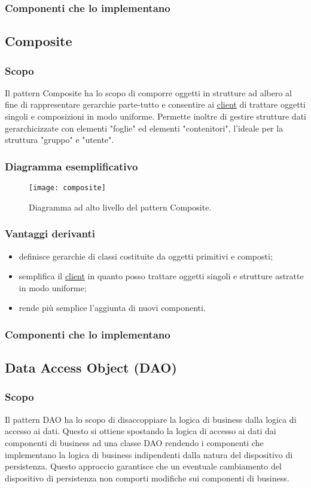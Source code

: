 \subsubsection{Componenti che lo implementano}

\subsection{Composite}
\subsubsection{Scopo}
Il pattern Composite ha lo scopo di comporre oggetti in strutture ad albero al fine di rappresentare gerarchie parte-tutto e consentire ai \underline{client} di trattare oggetti singoli e composizioni in modo uniforme. Permette inoltre di gestire strutture dati gerarchicizzate con elementi "foglie" ed elementi "contenitori", l'ideale per la struttura "gruppo" e "utente".
\subsubsection{Diagramma esemplificativo}
\begin{figure}[h]
\centering
\texttt{[image: composite]}
\caption{Diagramma ad alto livello del pattern Composite.}\label{fig:composite}
\end{figure}
\subsubsection{Vantaggi derivanti}
\begin{itemize}
\item definisce gerarchie di classi costituite da oggetti primitivi e composti;
\item semplifica il \underline{client} in quanto posso trattare oggetti singoli e strutture astratte in modo uniforme;
\item rende più semplice l'aggiunta di nuovi componenti.
\end{itemize}
\subsubsection{Componenti che lo implementano}

\subsection{Data Access Object (DAO)}
\subsubsection{Scopo}
Il pattern DAO ha lo scopo di disaccoppiare la logica di business dalla logica di accesso ai dati. Questo si ottiene spostando la logica di accesso ai dati dai componenti di business ad una classe DAO rendendo i componenti che implementano la logica di business indipendenti dalla natura del dispositivo di persistenza. Questo approccio garantisce che un eventuale cambiamento del dispositivo di persistenza non comporti modifiche sui componenti di business.
